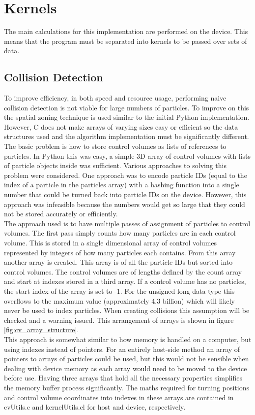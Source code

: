 \documentclass[10pt,a4paper,titlepage]{report}
\begin{document}
\section{Kernels}
The main calculations for this implementation are performed on the device. This means that the program must be separated into kernels to be passed over sets of data.
\subsection{Collision Detection}
\label{sec:OpenCL Collision Detection}
To improve efficiency, in both speed and resource usage, performing naive collision detection is not viable for large numbers of particles. To improve on this the spatial zoning technique is used similar to the initial Python implementation. However, C does not make arrays of varying sizes easy or efficient so the data structures used and the algorithm implementation must be significantly different.
\\The basic problem is how to store control volumes as lists of references to particles. In Python this was easy, a simple 3D array of control volumes with lists of particle objects inside was sufficient. Various approaches to solving this problem were considered. One approach was to encode particle IDs (equal to the index of a particle in the particles array) with a hashing function into a single number that could be turned back into particle IDs on the device. However, this approach was infeasible because the numbers would get so large that they could not be stored accurately or efficiently.
\\The approach used is to have multiple passes of assignment of particles to control volumes. The first pass simply counts how many particles are in each control volume. This is stored in a single dimensional array of control volumes represented by integers of how many particles each contains. From this array another array is created. This array is of all the particle IDs but sorted into control volumes. The control volumes are of lengths defined by the count array and start at indexes stored in a third array. If a control volume has no particles, the start index of the array is set to -1. For the unsigned long data type this overflows to the maximum value (approximately 4.3 billion) which will likely never be used to index particles. When creating collisions this assumption will be checked and a warning issued. This arrangement of arrays is shown in figure \ref{fig:cv_array_structure}.
\\This approach is somewhat similar to how memory is handled on a computer, but using indexes instead of pointers. For an entirely host-side method an array of pointers to arrays of particles could be used, but this would not be sensible when dealing with device memory as each array would need to be moved to the device before use. Having three arrays that hold all the necessary properties simplifies the memory buffer process significantly. The maths required for turning positions and control volume coordinates into indexes in these arrays are contained in cvUtils.c and kernelUtils.cl for host and device, respectively.
\end{document}
